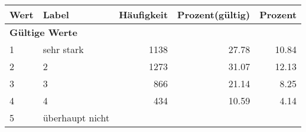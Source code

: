      \begin{longtable}{lXrrr}
     \toprule
     \textbf{Wert} & \textbf{Label} & \textbf{Häufigkeit} & \textbf{Prozent(gültig)} & \textbf{Prozent} \\
     \endhead
     \midrule
     \multicolumn{5}{l}{\textbf{Gültige Werte}}\\

     1 &
     \multicolumn{1}{X}{ sehr stark   } &


       \num{1138} &
       \num[round-mode=places,round-precision=2]{27.78} &
         \num[round-mode=places,round-precision=2]{10.84} \\

     2 &
     \multicolumn{1}{X}{ 2   } &


       \num{1273} &
       \num[round-mode=places,round-precision=2]{31.07} &
         \num[round-mode=places,round-precision=2]{12.13} \\

     3 &
     \multicolumn{1}{X}{ 3   } &


       \num{866} &
       \num[round-mode=places,round-precision=2]{21.14} &
         \num[round-mode=places,round-precision=2]{8.25} \\

     4 &
     \multicolumn{1}{X}{ 4   } &


       \num{434} &
       \num[round-mode=places,round-precision=2]{10.59} &
         \num[round-mode=places,round-precision=2]{4.14} \\

     5 &
     \multicolumn{1}{X}{ überhaupt nicht   } &



\end{longtable}
